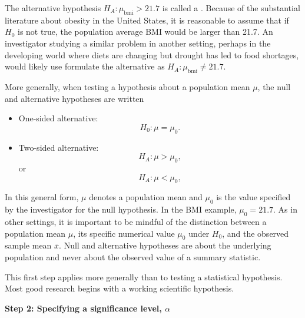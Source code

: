 \begin{spacing}{1.5}
\begin{itemize}
\end{itemize}	
	
The alternative hypothesis $ H_A: \mu_{\text{bmi}} > 21.7$	is called a .  Because of the substantial literature about obesity in the United States, it is reasonable to assume that if $H_0$ is not true, the population average BMI would be larger than 21.7.  An investigator studying a similar problem in another setting, perhaps in the developing world where diets are changing but drought has led to food shortages, would likely use formulate the alternative as $ H_A:\mu_{\text{bmi}} \ne 21.7$.

More generally, when testing a hypothesis about a population mean $\mu$, the null and alternative hypotheses are written

\begin{itemize}
	\item One-sided alternative:
	\begin{equation*}
		H_0: \mu = \mu_0.
	\end{equation*}
	\item Two-sided alternative:
	\begin{equation*}
		H_A: \mu > \mu_0,
	\end{equation*}
	or
	\begin{equation*}
		H_A: \mu < \mu_0,
	\end{equation*}		
\end{itemize}
In this general form, $\mu$ denotes a population mean and $\mu_0$ is the value specified by the investigator for the null hypothesis.  In the BMI example, $\mu_0 = 21.7$.  As in other settings, it is important to be mindful of the distinction between a population mean $\mu$, its specific numerical value $\mu_0$ under $H_0$,  and the observed sample mean $\overline{x}$.  Null and alternative hypotheses are about the underlying population and never about the observed value of a summary statistic.


This first step applies more generally than to testing a statistical hypothesis.  Most good research begins with a working scientific hypothesis.

\textbf{Step 2: Specifying a significance level, $\alpha$}


\end{spacing}
